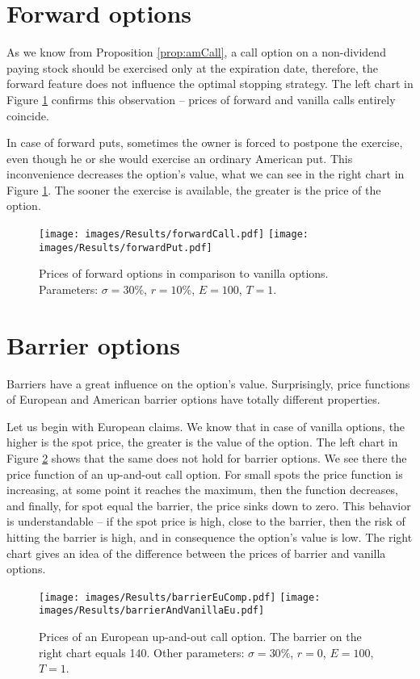 \documentclass[a4paper,11pt, twoside]{book}
\theoremstyle{definition}
\theoremstyle{remark}
\begin{document}
\section{Forward options}
As we know from Proposition \ref{prop:amCall}, a call option on a non-dividend paying stock should be exercised only at the expiration date, therefore, the forward feature does not influence the optimal stopping strategy. The left chart in Figure \ref{fig:results:forward} confirms this observation -- prices of forward and vanilla calls entirely coincide.

In case of forward puts, sometimes the owner is forced to postpone the exercise, even though he or she would exercise an ordinary American put. This inconvenience decreases the option's value, what we can see in the right chart in Figure \ref{fig:results:forward}. The sooner the exercise is available, the greater is the price of the option.

\begin{figure}[!htb]
\centering
 \texttt{[image: images/Results/forwardCall.pdf]}
 \texttt{[image: images/Results/forwardPut.pdf]}
\caption{Prices of forward options in comparison to vanilla options. Parameters: $\sigma = 30\%$, $r=10\%$, $E=100$, $T=1$.}
\label{fig:results:forward}
\end{figure}


\section{Barrier options}
Barriers have a great influence on the option's value. Surprisingly, price functions of European and American barrier options have totally different properties.

Let us begin with European claims. We know that in case of vanilla options, the higher is the spot price, the greater is the value of the option. The left chart in Figure \ref{fig:results:barrierEu} shows that the same does not hold for barrier options. We see there the price function of an up-and-out call option. For small spots the price function is increasing, at some point it reaches the maximum, then the function decreases, and finally, for spot equal the barrier, the price sinks down to zero. This behavior is understandable -- if the spot price is high, close to the barrier, then the risk of hitting the barrier is high, and in consequence the option's value is low. The right chart gives an idea of the difference between the prices of barrier and vanilla options.
\begin{figure}[!ht]
\centering
 \texttt{[image: images/Results/barrierEuComp.pdf]}
 \texttt{[image: images/Results/barrierAndVanillaEu.pdf]}
\caption{Prices of an European up-and-out call option. The barrier on the right chart equals 140. Other parameters: $\sigma = 30\%$, $r=0$, $E=100$, $T=1$.}
\label{fig:results:barrierEu}
\end{figure}
\end{document}
